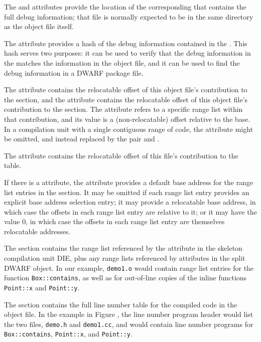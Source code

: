 The \DWATcompdir{} and \DWATdwoname{} attributes provide the
location of the corresponding \splitDWARFobjectfile{} that
contains the full debug information; that file is normally
expected to be in the same directory as the object file itself.

The \DWATdwoid{} attribute provides a hash of the debug
information contained in the \splitDWARFobjectfile. This hash serves
two purposes: it can be used to verify that the debug information
in the \splitDWARFobjectfile{} matches the information in the object
file, and it can be used to find the debug information in a DWARF
package file.

The \DWATaddrbase{} attribute contains the relocatable offset of
this object file's contribution to the \dotdebugaddr{} section, and
the \DWATrangesbase{} attribute contains the relocatable offset
of this object file's contribution to the \dotdebugranges{} section.
The \DWATranges{} attribute refers to a specific range list within
that contribution, and its value is a (non-relocatable) offset
relative to the base. In a compilation unit with a single
contiguous range of code, the \DWATranges{} attribute might be
omitted, and instead replaced by the pair \DWATlowpc{} and
\DWAThighpc.

The \DWATstmtlist{} attribute contains the relocatable offset of
this file's contribution to the \dotdebugline{} table.

If there is a \DWATranges{} attribute, the \DWATlowpc{} attribute
provides a default base address for the range list entries in the
\dotdebugranges{} section. It may be omitted if each range list entry
provides an explicit base address selection entry; it may provide
a relocatable base address, in which case the offsets in each
range list entry are relative to it; or it may have the value 0,
in which case the offsets in each range list entry are themselves
relocatable addresses.

The \dotdebugranges{} section contains the range list referenced by
the \DWATranges{} attribute in the skeleton compilation unit DIE,
plus any range lists referenced by \DWATranges{} attributes in the
split DWARF object. In our example, \texttt{demo1.o} would contain range
list entries for the function \texttt{Box::contains}, as well as for
out-of-line copies of the inline functions \texttt{Point::x} and 
\texttt{Point::y}.

The \dotdebugline{} section contains the full line number table for
the compiled code in the object file. In the example in
Figure , the line
number program header would list the two files, \texttt{demo.h} and
\texttt{demo1.cc}, and would contain line number programs for
\texttt{Box::contains}, \texttt{Point::x}, and \texttt{Point::y}.

